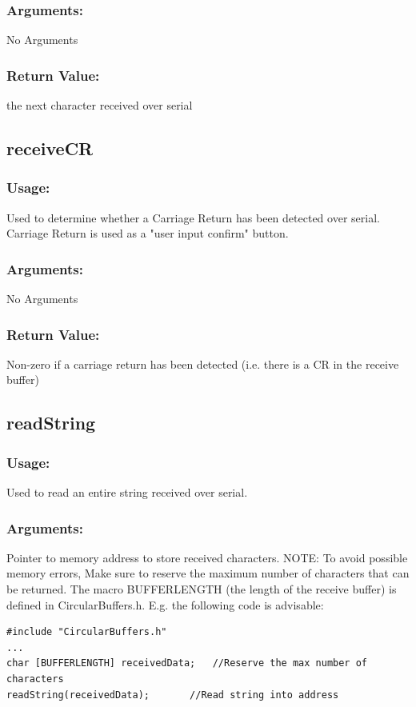 \documentclass[]{report}
\begin{document}
\subsubsection{Arguments:}
No Arguments

\subsubsection{Return Value:}
the next character received over serial

\subsection{receiveCR}
\subsubsection{Usage:}
Used to determine whether a Carriage Return has been detected over serial. Carriage Return is used as a "user input confirm" button.

\subsubsection{Arguments:}
No Arguments

\subsubsection{Return Value:}
Non-zero if a carriage return has been detected (i.e. there is a CR in the receive buffer)

\subsection{readString}
\subsubsection{Usage:}
Used to read an entire string received over serial.

\subsubsection{Arguments:}
Pointer to memory address to store received characters. \newline
NOTE: To avoid possible memory errors, Make sure to reserve the maximum number of characters that can be returned. The macro BUFFERLENGTH (the length of the receive buffer) is defined in CircularBuffers.h. E.g. the following code is advisable:
\begin{lstlisting}
#include "CircularBuffers.h"
...
char [BUFFERLENGTH] receivedData; 	//Reserve the max number of characters
readString(receivedData);		//Read string into address
\end{lstlisting}
\end{document}
